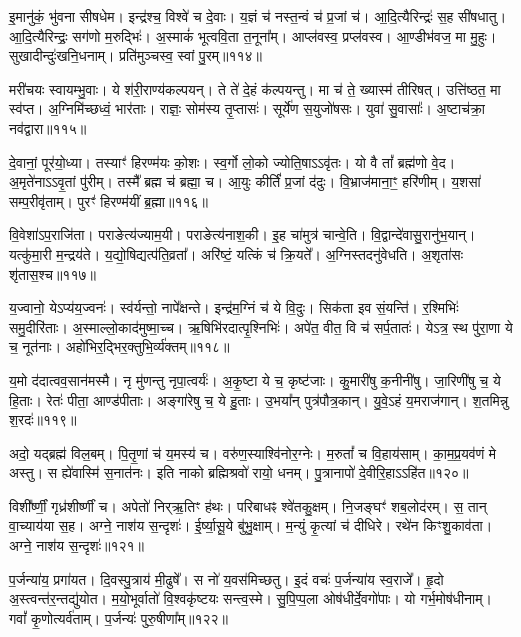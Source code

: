 इ॒मानु॑कं॒ भु॑वना सीषधेम। इन्द्र॑श्च॒ विश्वे॑ च दे॒वाः। 
य॒ज्ञं च॑ नस्त॒न्वं च॑ प्र॒जां च॑। आ॒दि॒त्यैरिन्द्रः॑ स॒ह सी॑षधातु। 
आ॒दि॒त्यैरिन्द्रः॒ सग॑णो म॒रुद्भिः॑। अ॒स्माकं॑ भूत्ववि॒ता त॒नूना᳚म्। 
आप्ल॑वस्व॒ प्रप्ल॑वस्व। आ॒ण्डीभ॑वज॒ मा मु॒हुः। 
सुखादीन्दुः॑खनि॒धनाम्। प्रति॑मुञ्चस्व॒ स्वां पु॒रम्॥११४॥\ip


मरी॑चयः स्वायम्भु॒वाः। ये श॑री॒राण्य॑कल्पयन्। 
ते ते॑ दे॒हं क॑ल्पयन्तु। मा च॑ ते॒ ख्यास्म॑ तीरिषत्। 
उत्ति॑ष्ठत॒ मा स्व॑प्त। अ॒ग्निमि॑च्छध्वं॒ भार॑ताः। 
राज्ञः॒ सोम॑स्य तृ॒प्तासः॑। सूर्ये॑ण स॒युजो॑षसः। 
युवा॑ सु॒वासाः᳚। अ॒ष्टाच॑क्रा॒ नव॑द्वारा॥११५॥\ip


दे॒वानां॒ पूर॑यो॒ध्या। तस्याꣳ॑ हिरण्म॑यः को॒शः। 
स्व॒र्गो लो॒को ज्योति॒षा\-ऽऽवृ॑तः। यो वै तां᳚ ब्रह्म॑णो वे॒द। 
अ॒मृते॑ना\-ऽऽवृ॒तां पु॑रीम्। तस्मै᳚ ब्रह्म च॑ ब्रह्मा॒ च। 
आ॒युः कीर्तिं॑ प्र॒जां द॑दुः। वि॒भ्राज॑माना॒ꣳ॒ हरि॑णीम्। 
य॒शसा॑ सम्प॒रीवृ॑ताम्। पुरꣳ॑ हिरण्म॑यीं ब्र॒ह्मा॥११६॥\ip


वि॒वेशा॑\-ऽप॒राजि॑ता। पराङेत्य॑ज्याम॒यी। 
पराङेत्य॑नाश॒की। इ॒ह चा॑मुत्र॑ चान्वे॒ति। 
वि॒द्वान्दे॑वासु॒रानु॑भ॒यान्। यत्कु॑मा॒री म॒न्द्रय॑ते। 
य॒द्यो॒षिद्यत्प॑ति॒व्रता᳚। अरि॑ष्टं॒ यत्किं च॑ क्रि॒यते᳚। 
अ॒ग्निस्तदनु॑वेधति। अ॒शृता॑सः शृ॑तास॒श्च॥११७॥\ip


य॒ज्वानो॒ ये\-ऽप्य॑य॒ज्वनः॑। स्व॑र्यन्तो॒ नापे᳚क्षन्ते। 
इन्द्र॑म॒ग्निं च॑ ये वि॒दुः। सिक॑ता इव सं॒यन्ति॑। 
र॒श्मिभिः॑ समु॒दीरि॑ताः। अ॒स्मा\-ल्लो॒का\-द॑मुष्मा॒च्च। 
ऋ॒षिभि॑रदात्पृ॒श्निभिः॑। 
अपे॑त॒ वीत॒ वि च॑ सर्प॒तातः॑। ये\-ऽत्र॒ स्थ पु॑रा॒णा ये च॒ नूत॑नाः। 
अहो॑भिर॒द्भिर॒क्तु\-भि॒र्व्य॑क्तम्॥११८॥\ip


य॒मो द॑दात्वव॒सान॑मस्मै। नृ मु॑णन्तु नृपा॒त्वर्यः॑। 
अ॒कृ॒ष्टा ये च॒ कृष्ट॑जाः। कु॒मारी॑षु क॒नीनी॑षु। 
जा॒रिणी॑षु च॒ ये हि॒ताः। रेतः॑ पीता॒ आण्ड॑पीताः। 
अङ्गा॑रेषु च॒ ये हु॒ताः। उ॒भया᳚न्‌ पुत्र॑पौत्र॒कान्। 
यु॒वे॒\-ऽहं य॒मराज॑गान्। श॒तमिन्नु श॒रदः॑॥११९॥\ip


अदो॒ यद्ब्रह्म॑ विल॒बम्। पि॒तृ॒णां च॑ य॒मस्य॑ च। 
वरु॑ण॒स्याश्वि॑नोर॒ग्नेः। म॒रुतां᳚ च वि॒हाय॑साम्। 
का॒म॒प्र॒यव॑णं मे अस्तु। स ह्ये॑वास्मि॑ स॒नात॑नः। 
इति नाको ब्रह्मिश्रवो॑ रायो॒ धनम्। पु॒त्रानापो॑ दे॒वीरि॒हा\-ऽऽहि॑त॥१२०॥\ip\anuvakamend


विशी᳚र्ष्णीं॒ गृध्र॑शीर्ष्णीं च। अपेतो॑ निर्‌ऋ॒तिꣳ ह॑थः। 
परिबाधꣴ श्वे॑तकु॒क्षम्। नि॒जङ्घꣳ॑ शब॒लोद॑रम्। 
स॒ तान्‌ वा॒च्याय॑या स॒ह। अग्ने॒ नाश॑य स॒न्दृशः॑। 
ई॒र्ष्या॒सू॒ये बु॑भु॒क्षाम्। म॒न्युं कृ॒त्यां च॑ दीधिरे। 
रथे॑न किꣳशु॒काव॑ता। अग्ने॒ नाश॑य स॒न्दृशः॑॥१२१॥\ip\anuvakamend


प॒र्जन्या॑य॒ प्रगा॑यत। दि॒वस्पु॒त्राय॑ मी॒ढुषे᳚। 
स नो॑ य॒वस॑मिच्छतु। इ॒दं वचः॑ प॒र्जन्या॑य स्व॒राजे᳚। 
हृ॒दो अ॒स्त्वन्त॑र॒न्तद्यु॑योत। म॒यो॒भूर्वातो॑ वि॒श्वकृ॑ष्टयः सन्त्व॒स्मे। 
सु॒पि॒प्प॒ला ओष॑धीर्दे॒वगो॑पाः। यो गर्भ॒मोष॑धीनाम्। 
गवां᳚ कृ॒णोत्यर्व॑ताम्। प॒र्जन्यः॑ पुरु॒षीणा᳚म्॥१२२॥\ip\anuvakamend


